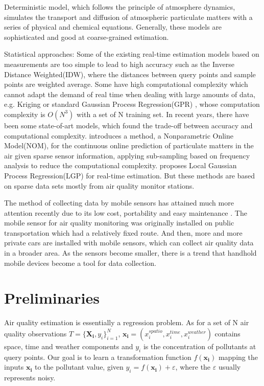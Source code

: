 \documentclass[twoside,leqno,twocolumn]{article}
\begin{document}
Deterministic model, which follows the principle of atmosphere dynamics, simulates the transport and diffusion of atmospheric particulate matters with a series of physical and chemical equations. Generally, these models are sophisticated and good at coarse-grained estimation. \cite{zhang2008online}\cite{Pfender2006Use}

Statistical approaches: Some of the existing real-time estimation models based on measurements are too simple to lead to high accuracy such as the Inverse Distance Weighted(IDW), where the distances between query points and sample points are weighted average. Some have high computational complexity which cannot adapt the demand of real time when dealing with large amounts of data, e.g. Kriging \cite{odeh1995further} or standard Gaussian Process Regression(GPR) \cite{rasmussen2006gaussian}, whose computation complexity is $O(N^3)$ with a set of N training set.
In recent years, there have been some state-of-art models, which found the trade-off between accuracy and computational complexity. \cite{guizilini2015nonparametric} introduces a method, a Nonparametric Online Model(NOM), for the continuous online prediction of particulate matters in the air given sparse sensor information, applying sub-sampling based on frequency analysis to reduce the computational complexity.  \cite{Nguyen2008Local} proposes Local Gaussian Process Regression(LGP) for real-time estimation. But these methods are based on sparse data sets mostly from air quality monitor stations.

The method of collecting data by mobile sensors has attained much more attention recently due to its low cost, portability and easy maintenance \cite{Hasenfratz2015Deriving}. The mobile sensor for air quality monitoring was originally installed on public transportation which had a relatively fixed route\cite{Devarakonda2013Real}\cite{Jutzeler2014A}. And then, more and more private cars are installed with mobile sensors, which can collect air quality data in a broader area. As the sensors become smaller, there is a trend that handhold mobile devices become a tool for data collection.

\section{Preliminaries}
Air quality estimation is essentially a regression problem. As for a set of N air quality observations $T=\{\bm{X_i}, y_i\}^N_{i=1}$, $\bm{x_i}=(x_i^{spatio}, x_i^{time}, x_i^{weather})$ contains space, time and weather components and $y_i$ is the concentration of pollutants at query points. Our goal is to learn a transformation function $f(\bm{x_i})$ mapping the inputs $\bm{x_i}$ to the pollutant value, given $y_i = f(\bm{x_i})+\varepsilon$, where the $\varepsilon$ usually represents noisy.
\end{document}

